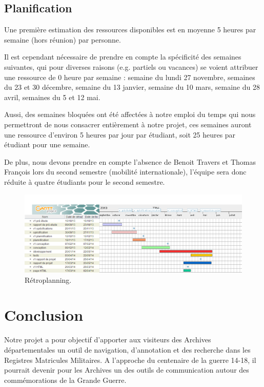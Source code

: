 \documentclass[a4paper]{article}
\begin{document}
\subsection{Planification}
\label{subsec:retroplanning}
	Une premi\`ere estimation des ressources disponibles est en moyenne 5 heures par semaine (hors r\'eunion) par personne.

	Il est cependant n\'ecessaire de prendre en compte la sp\'ecificit\'e des semaines suivantes, qui pour diverses raisons (e.g. partiels ou vacances) se voient attribuer une ressource de 0 heure par semaine : semaine du lundi 27 novembre, semaines du 23 et 30 d\'ecembre, semaine du 13 janvier, semaine du 10 mars, semaine du 28 avril, semaines du 5 et 12 mai.

	Aussi, des semaines bloqu\'ees ont \'et\'e affect\'ees \`a notre emploi du temps qui nous permettront de nous consacrer enti\`erement \`a notre projet, ces semaines auront une ressource d'environ 5 heures par jour par \'etudiant, soit 25 heures par \'etudiant pour une semaine.

	De plus, nous devons prendre en compte l'absence de Benoit Travers et Thomas Fran\c{c}ois lors du second semestre (mobilit\'e internationale), l'\'equipe sera donc r\'eduite \`a quatre \'etudiants pour le second semestre.

\begin{figure}[H]
\centering
\includegraphics[width=\textwidth]{retro_archive.png}
\caption{\label{fig:retroplanning}R\'etroplanning.}
\end{figure}

\section{Conclusion}
\label{sec:conclusion}

Notre projet a pour objectif d'apporter aux visiteurs des Archives d\'epartementales un outil de navigation, d'annotation et des recherche dans les Registres Matricules Militaires. A l'approche du centenaire de la guerre 14-18, il pourrait devenir pour les Archives un des outils de communication autour des comm\'emorations de la Grande Guerre.
\end{document}
